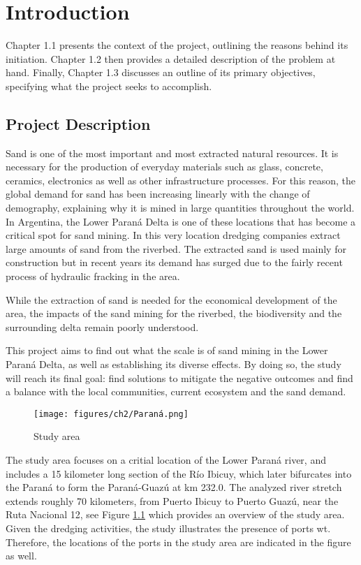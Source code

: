 \chapter{Introduction}
\label{chapter:introduction}

Chapter 1.1 presents the context of the project, outlining the reasons behind its initiation. Chapter 1.2 then provides a detailed description of the problem at hand. Finally, Chapter 1.3 discusses an outline of its primary objectives, specifying what the project seeks to accomplish.

\section{Project Description}
Sand is one of the most important and most extracted natural resources. It is necessary for the production of everyday materials such as glass, concrete, ceramics, electronics as well as other infrastructure processes. For this reason, the global demand for sand has been increasing linearly with the change of demography, explaining why it is mined in large quantities throughout the world. In Argentina, the Lower Paraná Delta is one of these locations that has become a critical spot for sand mining. In this very location dredging companies extract large amounts of sand from the riverbed. The extracted sand is used mainly for construction but in recent years its demand has surged due to the fairly recent process of hydraulic fracking in the area.



While the extraction of sand is needed for the economical development of the area, the impacts of the sand mining for the riverbed, the biodiversity and the surrounding delta remain poorly understood. 

This project aims to find out what the scale is of sand mining in the Lower Paraná Delta, as well as establishing its diverse effects. By doing so, the study will reach its final goal: find solutions to mitigate the negative outcomes and find a balance with the local communities, current ecosystem and the sand demand. 



\begin{figure}[H]
    \centering    \texttt{[image: figures/ch2/Paraná.png]}
    \caption{Study area}
    \label{fig:study area}
\end{figure}
\label{Figure 1.1}

The study area focuses on a critial location of the Lower Paraná river, and includes a 15 kilometer long section of the Río Ibicuy, which later bifurcates into the Paraná to form the Paraná-Guazú at km 232.0. The analyzed river stretch extends roughly 70 kilometers, from Puerto Ibicuy to Puerto Guazú, near the Ruta Nacional 12, see Figure \ref{fig:study area} which provides an overview of the study area. Given the dredging activities, the study illustrates the presence of ports wt. Therefore, the locations of the ports in the study area are indicated in the figure as well. 

